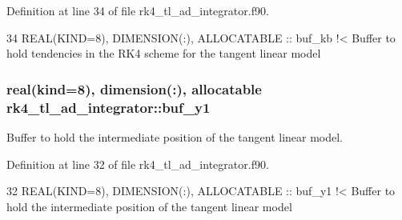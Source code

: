 Definition at line 34 of file rk4\+\_\+tl\+\_\+ad\+\_\+integrator.\+f90.


\begin{DoxyCode}
34   \textcolor{keywordtype}{REAL(KIND=8)}, \textcolor{keywordtype}{DIMENSION(:)}, \textcolor{keywordtype}{ALLOCATABLE} :: buf\_kb\textcolor{comment}{ !< Buffer to hold tendencies in the RK4 scheme for the
       tangent linear model}
\end{DoxyCode}
\subsubsection[{\texorpdfstring{buf\+\_\+y1}{buf_y1}}]{\setlength{\rightskip}{0pt plus 5cm}real(kind=8), dimension(\+:), allocatable rk4\+\_\+tl\+\_\+ad\+\_\+integrator\+::buf\+\_\+y1\hspace{0.3cm}{\ttfamily [private]}}\hypertarget{namespacerk4__tl__ad__integrator_a7a8fd6a2de598bb23bef4d88ddadbed2}{}\label{namespacerk4__tl__ad__integrator_a7a8fd6a2de598bb23bef4d88ddadbed2}


Buffer to hold the intermediate position of the tangent linear model. 



Definition at line 32 of file rk4\+\_\+tl\+\_\+ad\+\_\+integrator.\+f90.


\begin{DoxyCode}
32   \textcolor{keywordtype}{REAL(KIND=8)}, \textcolor{keywordtype}{DIMENSION(:)}, \textcolor{keywordtype}{ALLOCATABLE} :: buf\_y1\textcolor{comment}{ !< Buffer to hold the intermediate position of the
       tangent linear model}
\end{DoxyCode}
